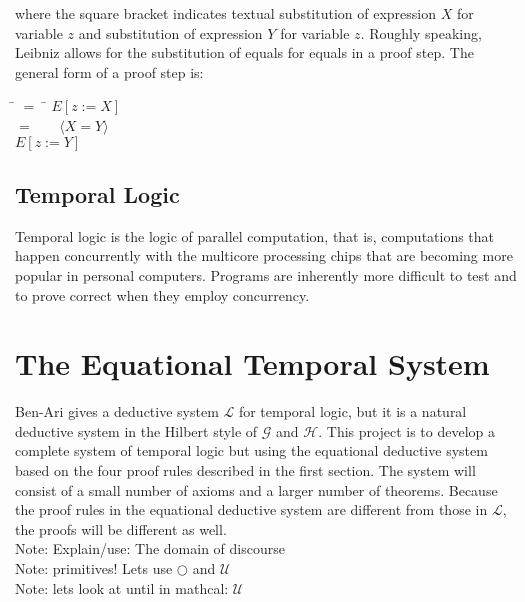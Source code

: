 \documentclass[fleqn, leqno]{article}
\newcommand{\lgap}{2pt}                             %
\newcommand{\mymathindent}{24pt}                      %
\newcommand{\Next}{\bigcirc}
\newcommand{\Gll} {\langle}                         %
\newcommand{\Ggg} {\rangle}                         %
\newcommand{\Hint}[1]     {\ \ \ $\Gll              \mbox{#1} \Ggg$ }   %
\begin{document}
where the square bracket indicates textual substitution of expression $X$ for variable $z$ and substitution
of expression $Y$ for variable $z$.
Roughly speaking, Leibniz allows for the substitution of equals for equals in a proof step.
The general form of a proof step is:

\begin{tabbing}
\hspace{\mymathindent} \= $= \;$ \=  \kill
  \> \>   $E[z:=X]$\\[\lgap]
  \> $=$  \>  \Hint{$X=Y$} \\[\lgap]
  \> \>   $E[z:=Y]$
\end{tabbing}

\subsection{Temporal Logic}

Temporal logic is the logic of parallel computation, that is, computations that happen concurrently
with the multicore processing chips that are becoming more popular in personal computers.
Programs are inherently more difficult to test and to prove correct when they employ concurrency.\\


\section{The Equational Temporal System}

Ben-Ari \cite{Ben} gives a deductive system $\mathcal{L}$ for temporal logic, but it is a
natural deductive system in the Hilbert style of $\mathcal{G}$ and $\mathcal{H}$. This project is to develop a complete system of
temporal logic but using the equational deductive system based on the four proof rules described
in the first section. The system will consist of a small number of axioms and a larger number of
theorems. Because the proof rules in the equational deductive system are different from those
in $\mathcal{L}$, the proofs will be different as well.\\

Note: Explain/use: The domain of discourse\\

Note: primitives!  Lets use $\Next$ and $\mathcal{U}$\\

Note: lets look at until in mathcal: $\mathcal{U}$\\
\end{document}

